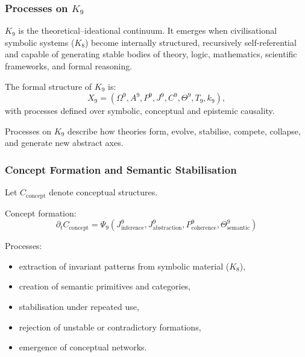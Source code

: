

\subsubsection{Processes on \texorpdfstring{$K_9$}{K_9}}
\label{sec:processes-k9}

$K_9$ is the theoretical–ideational continuum.
It emerges when civilisational symbolic systems ($K_8$) become internally
structured, recursively self-referential and capable of generating
stable bodies of theory, logic, mathematics, scientific frameworks,
and formal reasoning.

The formal structure of $K_9$ is:
\[
X_9 = (\Omega^9, A^9, P^9, J^9, C^9, \Theta^9, T_9, k_9),
\]
with processes defined over symbolic, conceptual and epistemic causality.

Processes on $K_9$ describe how theories form, evolve, stabilise,
compete, collapse, and generate new abstract axes.

\subsubsection{Concept Formation and Semantic Stabilisation}

Let $C_{\text{concept}}$ denote conceptual structures.

Concept formation:
\[
\partial_t C_{\text{concept}}
    = \Psi_9(J^9_{\text{inference}},
             J^9_{\text{abstraction}},
             P^9_{\text{coherence}},
             \Theta^9_{\text{semantic}})
\]

Processes:
\begin{itemize}
    \item extraction of invariant patterns from symbolic material ($K_8$),
    \item creation of semantic primitives and categories,
    \item stabilisation under repeated use,
    \item rejection of unstable or contradictory formations,
    \item emergence of conceptual networks.
\end{itemize}

